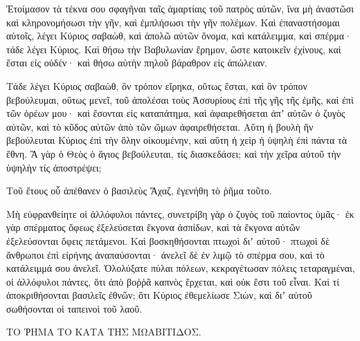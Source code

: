 {Ἑτοίμασον τὰ τέκνα σου σφαγῆναι ταῖς ἁμαρτίαις τοῦ πατρὸς αὐτῶν, ἵνα μὴ ἀναστῶσι καὶ κληρονομήσωσι τὴν γῆν, καὶ ἐμπλήσωσι τὴν γῆν πολέμων.
Καὶ ἐπαναστήσομαι αὐτοῖς, λέγει Κύριος σαβαὼθ, καὶ ἀπολῶ αὐτῶν ὄνομα, καὶ κατάλειμμα, καὶ σπέρμα· τάδε λέγει Κύριος.
Καὶ θήσω τὴν Βαβυλωνίαν ἔρημον, ὥστε κατοικεῖν ἐχίνους, καὶ ἔσται εἰς οὐδέν· καὶ θήσω αὐτὴν πηλοῦ βάραθρον εἰς ἀπώλειαν.
\par }{\PP {}Τάδε λέγει Κύριος σαβαὼθ, ὃν τρόπον εἴρηκα, οὕτως ἔσται, καὶ ὃν τρόπον βεβούλευμαι, οὕτως μενεῖ,
τοῦ ἀπολέσαι τοὺς Ἀσσυρίους ἐπὶ τῆς γῆς τῆς ἐμῆς, καὶ ἐπὶ τῶν ὀρέων μου· καὶ ἔσονται εἰς καταπάτημα, καὶ ἀφαιρεθήσεται ἀπʼ αὐτῶν ὁ ζυγὸς αὐτῶν, καὶ τὸ κῦδος αὐτῶν ἀπὸ τῶν ὤμων ἀφαιρεθήσεται.
Αὕτη ἡ βουλὴ ἣν βεβούλευται Κύριος ἐπὶ τὴν ὅλην οἰκουμένην, καὶ αὕτη ἡ χεὶρ ἡ ὑψηλὴ ἐπὶ πάντα τὰ ἔθνη.
Ἃ γὰρ ὁ Θεὸς ὁ ἅγιος βεβούλευται, τίς διασκεδάσει; καὶ τὴν χεῖρα αὐτοῦ τὴν ὑψηλὴν τίς ἀποστρέψει;
\par }{\PP {}Τοῦ ἔτους οὗ ἀπέθανεν ὁ βασιλεὺς Ἄχαζ, ἐγενήθη τὸ ῥῆμα τοῦτο.
\par }{\PP {}Μὴ εὐφρανθείητε οἱ ἀλλόφυλοι πάντες, συνετρίβη γὰρ ὁ ζυγὸς τοῦ παίοντος ὑμᾶς· ἐκ γὰρ σπέρματος ὄφεως ἐξελεύσεται ἔκγονα ἀσπίδων, καὶ τὰ ἔκγονα αὐτῶν ἐξελεύσονται ὄφεις πετάμενοι.
Καὶ βοσκηθήσονται πτωχοὶ διʼ αὐτοῦ· πτωχοὶ δὲ ἄνθρωποι ἐπὶ εἰρήνης ἀναπαύσονται· ἀνελεῖ δὲ ἐν λιμῷ τὸ σπέρμα σου, καὶ τὸ κατάλειμμά σου ἀνελεῖ.
Ὀλολύξατε πύλαι πόλεων, κεκραγέτωσαν πόλεις τεταραγμέναι, οἱ ἀλλόφυλοι πάντες, ὅτι ἀπὸ βοῤῥᾶ καπνὸς ἔρχεται, καὶ οὐκ ἔστι τοῦ εἶναι.
Καὶ τί ἀποκριθήσονται βασιλεῖς ἐθνῶν; ὅτι Κύριος ἐθεμελίωσε Σιὼν, καὶ διʼ αὐτοῦ σωθήσονται οἱ ταπεινοὶ τοῦ λαοῦ.
\par }{\PP ΤΟ ῬΗΜΑ ΤΟ ΚΑΤΑ ΤΗΣ ΜΩΑΒΙΤΙΔΟΣ.

\par }
